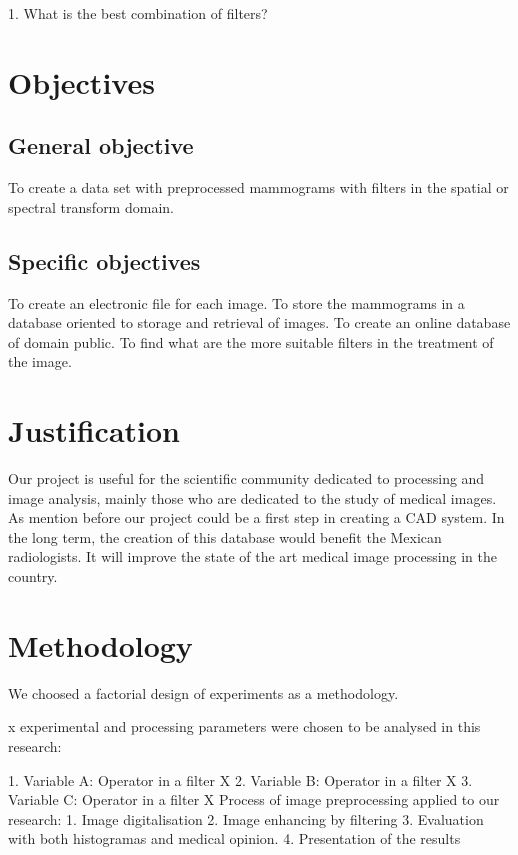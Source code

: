 1. What is the best combination of filters?

\section{Objectives}
\subsection{General objective}

To create a data set with preprocessed mammograms with filters in the spatial
or spectral transform domain.

\subsection{Specific objectives}

To create an electronic file for each image.
To store the mammograms in a database oriented to storage and retrieval of images.
To create an online database of domain public.
To find what are the more suitable filters in the treatment of the image.

\section{Justification}

Our project is useful for the scientific community dedicated to processing and
image analysis, mainly those who are dedicated to the study of medical images.
As mention before our project could be a first step in creating a CAD system.
In the long term, the creation of this database would benefit the Mexican
radiologists. It will improve the state of the art medical image processing in
the country.

\section{Methodology}

We choosed a factorial design of experiments as a methodology.

x experimental and processing parameters were chosen to be analysed in this
research:

1. Variable A: Operator in a filter X 
2. Variable B: Operator in a filter X
3. Variable C: Operator in a filter X
Process of image preprocessing applied to our research:
1. Image digitalisation        
2. Image enhancing by filtering
3. Evaluation with both histogramas and medical opinion.
4. Presentation of the results

